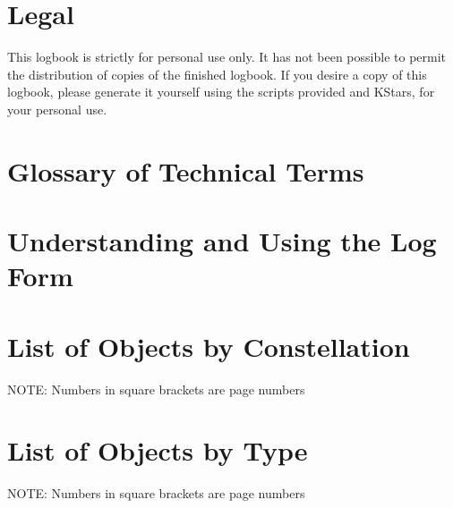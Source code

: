 \documentclass[oneside]{book}
\begin{document}
\author{The Astronomy Logbook Project}



\chapter{Legal}
\label{Legal}

This logbook is strictly for personal use only. It has not been
possible to permit the distribution of copies of the finished
logbook. If you desire a copy of this logbook, please generate it
yourself using the scripts provided and KStars, for your personal use.






\mainmatter



\chapter{Glossary of Technical Terms}



\chapter{Understanding and Using the Log Form}



\twocolumn
\chapter{List of Objects by Constellation}
NOTE: Numbers in square brackets are page numbers \\



\chapter{List of Objects by Type}
NOTE: Numbers in square brackets are page numbers \\
\end{document}

